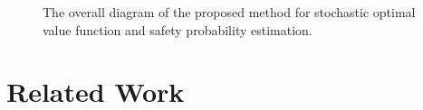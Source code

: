 \documentclass[letterpaper]{article} %
\newcommand{\todo}[1]{\textcolor{blue}{[TODO: #1]}}
\newcommand{\resolved}[1]{}
\begin{document}
\begin{figure}
    \centering
    
    \caption{The overall diagram of the proposed method for stochastic optimal value function and safety probability estimation. \resolved{remove task x.x and replace with content in this paper}
    }
    \label{fig:overall_diagram}
\end{figure}

\vspace{-0.5em}






\section{Related Work}
\label{sec:related_work}
\end{document}
